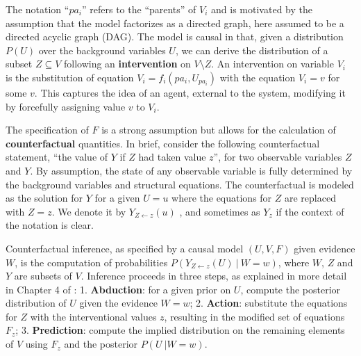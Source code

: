 The notation ``$pa_i$'' refers to the ``parents'' of $V_i$ and is
motivated by the assumption that the model factorizes as a directed
graph, here assumed to be a directed acyclic graph (DAG).  The model
is causal in that, given a distribution $P(U)$ over the background
variables $U$, we can derive the distribution of a subset $Z \subseteq
V$ following an {\bf intervention} on $V\setminus Z$.  An 
  intervention on variable $V_i$ is the substitution of equation $V_i
= f_i(pa_i, U_{pa_i})$ with the equation $V_i = v$ for some $v$. This
captures the idea of an agent, external to the system, modifying it by
forcefully assigning value $v$ to $V_i$.

The specification of $F$ is a strong assumption but allows for the
calculation of {\bf counterfactual} quantities.  In brief, consider
the following counterfactual statement, ``the value of $Y$ if $Z$ had
taken value $z$'', for two observable variables $Z$ and $Y$. By
assumption, the state of any observable variable is fully determined
by the background variables and structural equations. The
counterfactual is modeled as the solution for $Y$ for a given $U = u$
where the equations for $Z$ are replaced with $Z \!=\!  z$.  We denote
it by $Y_{Z \leftarrow z}(u)$ \cite{pearl:00}, and sometimes as $Y_z$
if the context of the notation is clear.

Counterfactual inference, as specified by a causal model $(U, V, F)$
given evidence $W$, is the computation of probabilities $P(Y_{Z
  \leftarrow z}(U)\ |\ W \!=\! w)$, where $W$, $Z$ and $Y$ are subsets
of $V$. Inference proceeds in three steps, as explained in more detail
in Chapter 4 of \citet{pearl:16}: 1. {\bf Abduction}: for a given
prior on $U$, compute the posterior distribution of $U$ given the
evidence $W = w$; 2. {\bf Action}: substitute the equations for $Z$
with the interventional values $z$, resulting in the modified set of
equations $F_z$; 3. {\bf Prediction}: compute the implied distribution
on the remaining elements of $V$ using $F_z$ and the posterior $P(U\ |
W = w)$.




